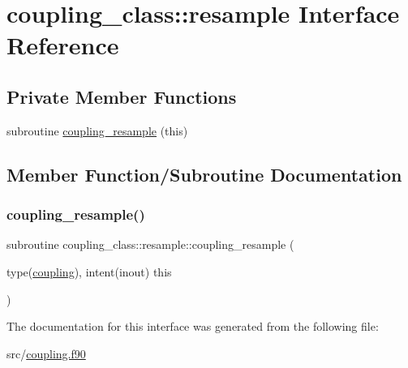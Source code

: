\hypertarget{interfacecoupling__class_1_1resample}{}\section{coupling\+\_\+class\+:\+:resample Interface Reference}
\label{interfacecoupling__class_1_1resample}
\subsection*{Private Member Functions}
\begin{DoxyCompactItemize}
\item 
subroutine \hyperlink{interfacecoupling__class_1_1resample_a891c5661a611f06a1445434ff2dd2e4e}{coupling\+\_\+resample} (this)
\end{DoxyCompactItemize}


\subsection{Member Function/\+Subroutine Documentation}
\mbox{\label{interfacecoupling__class_1_1resample_a891c5661a611f06a1445434ff2dd2e4e}} 
\subsubsection{\texorpdfstring{coupling\+\_\+resample()}{coupling\_resample()}}
{\footnotesize\ttfamily subroutine coupling\+\_\+class\+::resample\+::coupling\+\_\+resample (\begin{DoxyParamCaption}\item[{type(\hyperlink{structcoupling__class_1_1coupling}{coupling}), intent(inout)}]{this }\end{DoxyParamCaption})\hspace{0.3cm}{\ttfamily [private]}}



The documentation for this interface was generated from the following file\+:\begin{DoxyCompactItemize}
\item 
src/\hyperlink{coupling_8f90}{coupling.\+f90}\end{DoxyCompactItemize}
